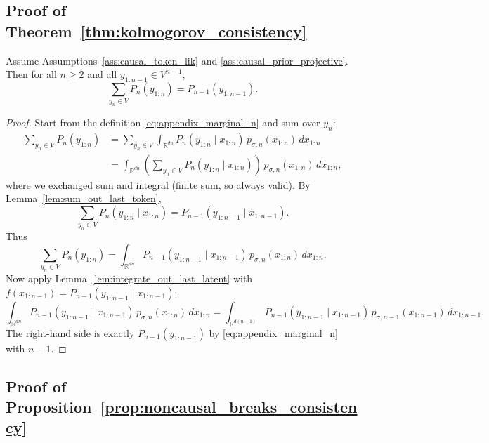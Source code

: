 \documentclass[11pt]{article}
\begin{document}

\subsection{Proof of Theorem~\ref{thm:kolmogorov_consistency}}
\label{app:proof_kolmogorov_consistency}

\begin{theorem}
Assume Assumptions~\ref{ass:causal_token_lik} and \ref{ass:causal_prior_projective}.
Then for all $n\ge 2$ and all $y_{1:n-1}\in V^{n-1}$,
\[
\sum_{y_n\in V} P_n(y_{1:n})
=
P_{n-1}(y_{1:n-1}).
\]
\end{theorem}

\begin{proof}
Start from the definition \eqref{eq:appendix_marginal_n} and sum over $y_n$:
\begin{align*}
\sum_{y_n\in V} P_n(y_{1:n})
&=
\sum_{y_n\in V} \int_{\mathbb R^{dn}} P_n(y_{1:n}\mid x_{1:n})\,p_{\sigma,n}(x_{1:n})\,dx_{1:n} \\
&=
\int_{\mathbb R^{dn}} \left(\sum_{y_n\in V} P_n(y_{1:n}\mid x_{1:n})\right)\,p_{\sigma,n}(x_{1:n})\,dx_{1:n},
\end{align*}
where we exchanged sum and integral (finite sum, so always valid).
By Lemma~\ref{lem:sum_out_last_token},
\[
\sum_{y_n\in V} P_n(y_{1:n}\mid x_{1:n})
=
P_{n-1}(y_{1:n-1}\mid x_{1:n-1}).
\]
Thus
\[
\sum_{y_n\in V} P_n(y_{1:n})
=
\int_{\mathbb R^{dn}} P_{n-1}(y_{1:n-1}\mid x_{1:n-1})\,p_{\sigma,n}(x_{1:n})\,dx_{1:n}.
\]
Now apply Lemma~\ref{lem:integrate_out_last_latent} with
$f(x_{1:n-1}) = P_{n-1}(y_{1:n-1}\mid x_{1:n-1})$:
\[
\int_{\mathbb R^{dn}} P_{n-1}(y_{1:n-1}\mid x_{1:n-1})\,p_{\sigma,n}(x_{1:n})\,dx_{1:n}
=
\int_{\mathbb R^{d(n-1)}} P_{n-1}(y_{1:n-1}\mid x_{1:n-1})\,p_{\sigma,n-1}(x_{1:n-1})\,dx_{1:n-1}.
\]
The right-hand side is exactly $P_{n-1}(y_{1:n-1})$ by \eqref{eq:appendix_marginal_n} with $n-1$.
\end{proof}


\subsection{Proof of Proposition~\ref{prop:noncausal_breaks_consistency}}
\label{app:proof_noncausal_breaks}
\end{document}
